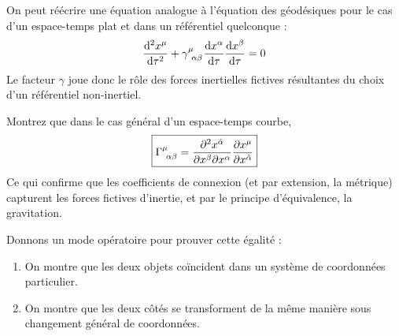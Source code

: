 On peut réécrire une équation analogue à l'équation des géodésiques pour le cas d'un espace-temps plat et dans un référentiel quelconque :
\begin{equation}
    \frac{\td ^2x^{\mu}}{\td \tau^2} + \gamma\indices{^\mu_{\!\alpha\beta}} \frac{\td x^{\alpha}}{\td \tau}\frac{\td x^{\beta}}{\td \tau}=0
\end{equation}
Le facteur $\gamma$ joue donc le rôle des forces inertielles fictives résultantes du choix d'un référentiel non-inertiel. 
\begin{exerc}
    Montrez que dans le cas général d'un espace-temps courbe, 
    \begin{equation}
        \boxed{\Gamma\indices{^{\mu}_{\!\alpha \beta}} = \frac{\partial^2 x^{\hat{\alpha}}}{\partial x^{\beta}\partial x^{\alpha}}\frac{\partial x^{\mu}}{\partial x^{\hat{\alpha}}} }
        \label{eq: Coefficients en dérivées}
    \end{equation}
    Ce qui confirme que les coefficients de connexion (et par extension, la métrique) capturent les forces fictives d'inertie, et par le principe d'équivalence, la gravitation.
\end{exerc}
Donnons un mode opératoire pour prouver cette égalité :
\begin{enumerate}
    \item On montre que les deux objets coïncident dans un système de coordonnées particulier. 
    \item On montre que les deux côtés se transforment de la même manière sous changement général de coordonnées.
\end{enumerate}
